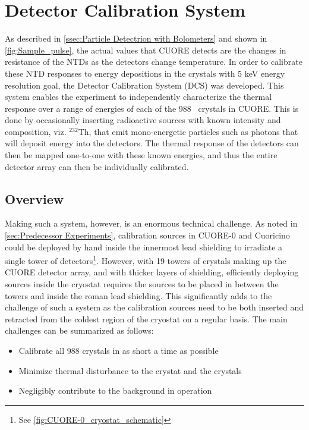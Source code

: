 \chapter{Detector Calibration System}
\label{chap:DCS}

As described in \autoref{ssec:Particle Detectrion with Bolometers} and shown in \autoref{fig:Sample_pulse}, the actual values that CUORE detects are the changes in resistance of the NTDs as the detectors change temperature.
In order to calibrate these NTD responses to energy depositions in the crystals with 5 keV energy resolution goal, the Detector Calibration System (DCS) was developed.
This system enables the experiment to independently characterize the thermal response over a range of energies of each of the 988 \teotwo~crystals in CUORE.
This is done by occasionally inserting radioactive sources with known intensity and composition, viz. $^{232}$Th, that emit mono-energetic particles such as photons that will deposit energy into the detectors.
The thermal response of the detectors can then be mapped one-to-one with these known energies, and thus the entire detector array can then be individually calibrated.

\section{Overview}

Making such a system, however, is an enormous technical challenge.
As noted in \autoref{sec:Predecessor Experiments}, calibration sources in CUORE-0 and Cuoricino could be deployed by hand inside the innermost lead shielding to irradiate a single tower of detectors\footnote{See \autoref{fig:CUORE-0_cryostat_schematic}}.
However, with 19 towers of crystals making up the CUORE detector array, and with thicker layers of shielding, efficiently deploying sources inside the cryostat requires the sources to be placed in between the towers and inside the roman lead shielding.
This significantly adds to the challenge of such a system as the calibration sources need to be both inserted and retracted from the coldest region of the cryostat on a regular basis.
The main challenges can be summarized as follows: 
\begin{itemize}
\item Calibrate all 988 crystals in as short a time as possible
\item Minimize thermal disturbance to the crystat and the crystals
\item Negligibly contribute to the background in operation
\end{itemize}

